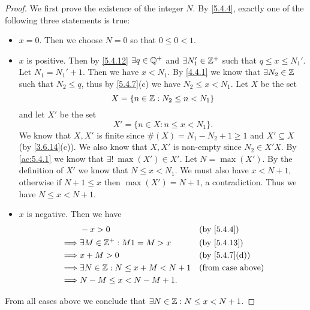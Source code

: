 \begin{proof}
  We first prove the existence of the integer \(N\).
  By \cref{5.4.4}, exactly one of the following three statements is true:
  \begin{itemize}
    \item \(x = 0\).
          Then we choose \(N = 0\) so that \(0 \leq 0 < 1\).
    \item \(x\) is positive.
          Then by \cref{5.4.12} \(\exists q \in \mathbb{Q}^+\) and \(\exists N_1' \in \mathbb{Z}^+\) such that \(q \leq x \leq N_1'\).
          Let \(N_1 = N_1' + 1\).
          Then we have \(x < N_1\).
          By \cref{4.4.1} we know that \(\exists N_2 \in \mathbb{Z}\) such that \(N_2 \leq q\), thus by \cref{5.4.7}(c) we have \(N_2 \leq x < N_1\).
          Let \(X\) be the set
          \[
            X = \{n \in \mathbb{Z} : N_2 \leq n < N_1\}
          \]
          and let \(X'\) be the set
          \[
            X' = \{n \in X : n \leq x < N_1\}.
          \]
          We know that \(X, X'\) is finite since \(\#(X) = N_1 - N_2 + 1 \geq 1\) and \(X' \subseteq X\) (by \cref{3.6.14}(c)).
          We also know that \(X, X'\) is non-empty since \(N_2 \in X'X\).
          By \cref{ac:5.4.1} we know that \(\exists!\ \max(X') \in X'\).
          Let \(N = \max(X')\).
          By the definition of \(X'\) we know that \(N \leq x < N_1\).
          We must also have \(x < N + 1\), otherwise if \(N + 1 \leq x\) then \(\max(X') = N + 1\), a contradiction.
          Thus we have \(N \leq x < N + 1\).
    \item \(x\) is negative.
          Then we have
          \begin{align*}
                     & -x > 0                                  &  & \by{5.4.4}                  \\
            \implies & \exists M \in \Z^+ : M1 = M > x         &  & \by{5.4.13}                 \\
            \implies & x + M > 0                               &  & \text{(by \cref{5.4.7}(d))} \\
            \implies & \exists N \in \Z : N \leq x + M < N + 1 &  & \text{(from case above)}    \\
            \implies & N - M \leq x < N - M + 1.
          \end{align*}
  \end{itemize}
  From all cases above we conclude that \(\exists N \in \mathbb{Z} : N \leq x < N + 1\).


\end{proof}

